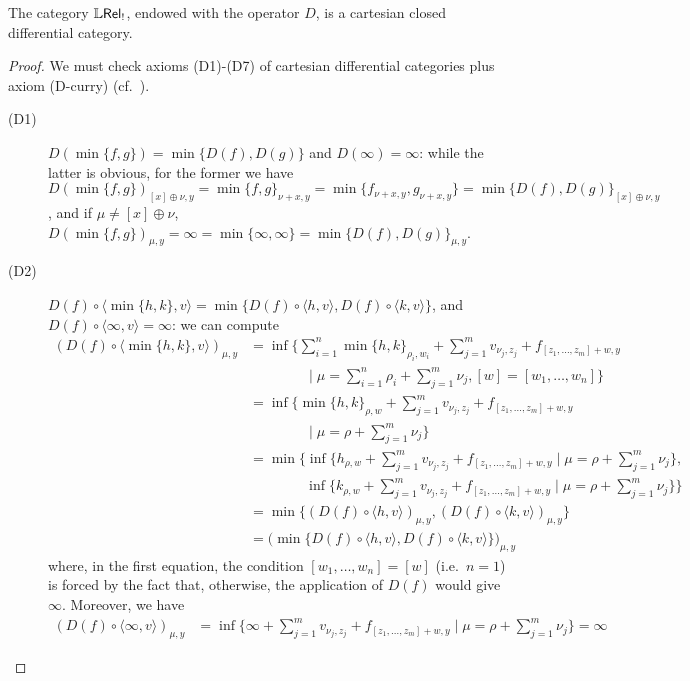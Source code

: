 \begin{proposition}\label{propApp:CCDC}
The category $\mathbb{L} \mathsf{Rel}_!$, endowed with the operator $D$, is a cartesian closed differential category.
\end{proposition}
\begin{proof}
We must check axioms (D1)-(D7) of cartesian differential categories  plus axiom (D-curry) (cf.~\cite{Manzo2012}).
\begin{description}
\item[(D1)]$D(\min\{f,g\})=\min \{D(f),D(g)\}$ and $D(\infty)=\infty$: 
while the latter is obvious, for the former we have 
$D(\min\{f,g\})_{[x]\oplus\nu,y}= \min\{f,g\}_{\nu+x,y}= \min\{f_{\nu+x,y},g_{\nu+x,y}\}=\min\{D(f),D(g)\}_{[x]\oplus \nu,y}$, and if $\mu\neq [x]\oplus \nu$, 
$D(\min\{f,g\})_{\mu,y}= \infty= \min\{\infty, \infty\}=\min\{ D(f),D(g)\}_{\mu,y}$. 
\item[(D2)]
$D(f)\circ \langle \min\{h,k\},v\rangle= \min\{ D(f)\circ \langle h,v\rangle, D(f)\circ \langle k,v\rangle\}$, and $D(f)\circ \langle \infty,v\rangle=\infty$: we can compute
	\begin{align*}
	(D(f)\circ \langle \min\{h,k\},v\rangle)_{\mu,y}&=
	\inf\Big\{ 
	\sum_{i=1}^{n}\min\{h,k\}_{\rho_{i},w_{i}}+
	\sum_{j=1}^{m}v_{\nu_{j},z_{j}}
	+
	f_{[z_{1},\dots, z_{m}]+w,y}\\
&	\qquad\qquad\mid
	\mu=\sum_{i=1}^{n}\rho_{i}+\sum_{j=1}^{m}\nu_{j},	[w]=[w_{1},\dots, w_{n}]
	\Big\}\\
	& 
=	\inf\Big\{ 
	\min\{h,k\}_{\rho,w}+
	\sum_{j=1}^{m}v_{\nu_{j},z_{j}}
	+
	f_{[z_{1},\dots, z_{m}]+w,y}\\
&	\qquad\qquad\mid
	\mu=\rho+\sum_{j=1}^{m}\nu_{j}
	\Big\}\\
	&=	\min\Big\{\inf\big\{ 
	h_{\rho,w}+
	\sum_{j=1}^{m}v_{\nu_{j},z_{j}}
	+
	f_{[z_{1},\dots, z_{m}]+w,y}	\mid
	\mu=\rho+\sum_{j=1}^{m}\nu_{j}\big\}, \\
	& \qquad\qquad \inf\big\{ 
	k_{\rho,w}+
	\sum_{j=1}^{m}v_{\nu_{j},z_{j}}
	+
	f_{[z_{1},\dots, z_{m}]+w,y}	\mid
	\mu=\rho+\sum_{j=1}^{m}\nu_{j}\big\}\Big\}\\
	& = \min\Big\{(D(f)\circ \langle h,v\rangle)_{\mu,y}, (D(f)\circ \langle k,v\rangle)_{\mu,y}\Big\}\\
		& = \Big(\min\big\{D(f)\circ \langle h,v\rangle, D(f)\circ \langle k,v\rangle\big\}\Big )_{\mu,y}
	\end{align*}
	where, in the first equation, the condition $[w_{1},\dots, w_{n}]=[w]$ (i.e.~$n=1$) is forced by the fact that, otherwise, the application of $D(f)$ would give $\infty$. Moreover, we have
\begin{align*}
(D(f) \circ \langle \infty, v\rangle)_{\mu,y}&=\inf\Big\{ 
	\infty+
	\sum_{j=1}^{m}v_{\nu_{j},z_{j}}
	+
	f_{[z_{1},\dots, z_{m}]+w,y}\mid
	\mu=\rho+\sum_{j=1}^{m}\nu_{j}
	\Big\} = \infty
\end{align*}


\end{description}
\end{proof}
